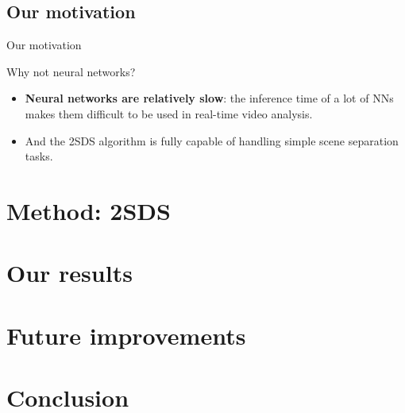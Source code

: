 \documentclass[aspectratio=43,display]{beamer}
\begin{document}
	\subsection{Our motivation}

		\begin{frame}{Our motivation}

			Why not neural networks?

			\begin{itemize}
				\item \textbf{Neural networks are relatively slow}: the inference time of a lot of NNs makes them difficult to be used in real-time video analysis.
				\item And the 2SDS algorithm is fully capable of handling simple scene separation tasks.
			\end{itemize}


		\end{frame}


	\section{Method: 2SDS}

	\section{Our results}

	\section{Future improvements}

	\section{Conclusion}
\end{document}
